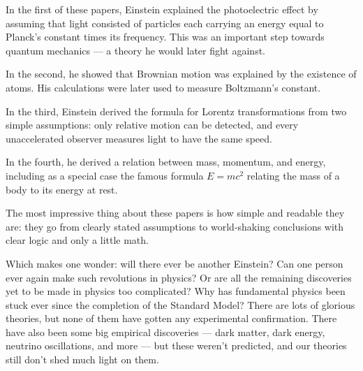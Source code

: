 \documentclass{article}
\renewcommand{\texttt}[1]{%
  \begingroup
  \ttfamily
  \begingroup\lccode`~=`/\lowercase{\endgroup\def~}{/\discretionary{}{}{}}%
  \begingroup\lccode`~=`[\lowercase{\endgroup\def~}{[\discretionary{}{}{}}%
  \begingroup\lccode`~=`.\lowercase{\endgroup\def~}{.\discretionary{}{}{}}%
  \catcode`/=\active\catcode`[=\active\catcode`.=\active
  \scantokens{#1\noexpand}%
  \endgroup
}
\begin{document}

In the first of these papers, Einstein explained the photoelectric
effect by assuming that light consisted of particles each carrying an
energy equal to Planck's constant times its frequency. This was an
important step towards quantum mechanics --- a theory he would later
fight against.

In the second, he showed that Brownian motion was explained by the
existence of atoms. His calculations were later used to measure
Boltzmann's constant.

In the third, Einstein derived the formula for Lorentz transformations
from two simple assumptions: only relative motion can be detected, and
every unaccelerated observer measures light to have the same speed.

In the fourth, he derived a relation between mass, momentum, and energy,
including as a special case the famous formula \(E = mc^2\) relating the
mass of a body to its energy at rest.

The most impressive thing about these papers is how simple and readable
they are: they go from clearly stated assumptions to world-shaking
conclusions with clear logic and only a little math.

Which makes one wonder: will there ever be another Einstein? Can one
person ever again make such revolutions in physics? Or are all the
remaining discoveries yet to be made in physics too complicated? Why has
fundamental physics been stuck ever since the completion of the Standard
Model? There are lots of glorious theories, but none of them have gotten
any experimental confirmation. There have also been some big empirical
discoveries --- dark matter, dark energy, neutrino oscillations, and
more --- but these weren't predicted, and our theories still don't shed
much light on them.
\end{document}
